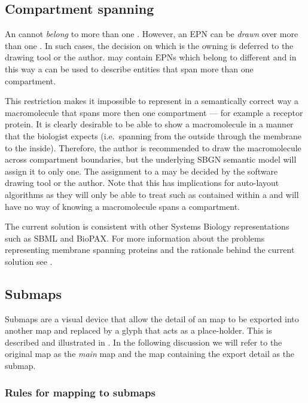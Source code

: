 \subsection{Compartment spanning}

An  cannot \emph{belong} to more than one
. However, an EPN can be \emph{drawn} over more than one
. In such cases, the decision on which is the owning
 is deferred to the drawing tool or the
author.  may contain EPNs which belong to different
 and in this way a  can be used to describe
entities that span more than one {compartment}.

This restriction makes it impossible to represent in a semantically
correct way a macromolecule that spans more then one compartment ---
for example a receptor protein. It is clearly desirable to be able to
show a macromolecule in a manner that the biologist expects (i.e.\,
spanning from the outside through the membrane to the
inside). Therefore, the author is recommended to draw the
macromolecule across compartment boundaries, but the underlying SBGN
semantic model will assign it to only one. The assignment to a
 may be decided by the software drawing tool or the
author. Note that this has implications for auto-layout algorithms as
they will only be able to treat such  as contained within
a  and will have no way of knowing a macromolecule spans a
compartment.

The current solution is consistent with other Systems Biology
representations such as SBML and BioPAX. For more information about the
problems representing membrane spanning proteins and the rationale
behind the current solution see .

\subsection{Submaps}

Submaps are a visual device that allow the detail of an \PD map to be exported into another \PD map and replaced by a  glyph that acts as a place-holder. This is described and illustrated in . In the following discussion we will refer to the original map as the \emph{main} map and the map containing the export detail as the submap. 

\subsubsection{Rules for mapping to submaps}

